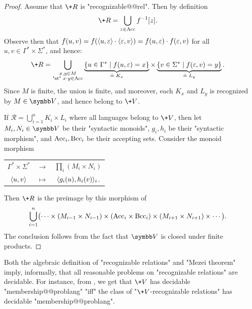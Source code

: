 \begin{proof}
	Assume that $\+R$ is "recognizable@@rel". 
	Then by definition
	\[
		\+R = \bigcup_{z \in \Acc} f^{-1}[z].
	\]
	Observe then that $f(u,v) = f(\langle u,\varepsilon\rangle\cdot\langle\varepsilon,v\rangle)
	= f(u,\varepsilon)\cdot f(\varepsilon,v)$ for all $u,v \in \Gamma^* \times \Sigma^*$, and hence:
	\[
		\+R = \bigcup_{\substack{x,y \in M\\ \text{"st" } x\cdot y \in \Acc}}
		\underbrace{\{u \in \Gamma^* \mid f(u, \varepsilon) = x\}}_{\defeq \;K_x}
		\times \underbrace{\{v \in \Sigma^* \mid f(\varepsilon, v) = y\}}_{\defeq \;L_y}.
	\]
	Since $M$ is finite, the union is finite, and moreover, each $K_x$ and $L_y$ is
	recognized by $M \in \B{V}$, and hence belong to $\+V$.

	 If $\mathcal{R} = \bigcup_{i=1}^n K_i \times L_i$ 
		where all languages belong to $\+V$, then let $M_i,N_i \in \B{V}$
		be their "syntactic monoids", $g_i,h_i$ be their
		"syntactic morphism", and $\textrm{Acc}_i,\textrm{Bcc}_i$ be their accepting sets.
		Consider the monoid morphism
		\begin{center}
		\begin{tabular}{ccc}
			$\Gamma^* \times \Sigma^*$ & $\to$ & $\prod_{i}(M_i \times N_i)$ \\
			$\langle u,v\rangle$ & $\mapsto$ & $\langle g_i(u), h_i(v)\rangle_{i}$.
		\end{tabular}
		\end{center}
		Then $\+R$ is the preimage by this morphism of
		\[
			\bigcup_{i=1}^n \bigl(
			\cdots \times (M_{i-1}\times N_{i-1}) \times
			(\textrm{Acc}_i \times \textrm{Bcc}_i) \times (M_{i+1}\times N_{i+1}) \times \cdots \bigr).
		\]
		The conclusion follows from the fact that $\B{V}$ is closed under finite products.
\end{proof}

Both the algebraic definition of "recognizable relations" and
"Mezei theorem" imply, informally, that all reasonable problems on
"recognizable relations" are decidable. For instance, from ,
we get that $\+V$ has decidable "membership@@problang" "iff" the class of "$\+V$-recognizable relations"
has decidable "membership@@problang".

